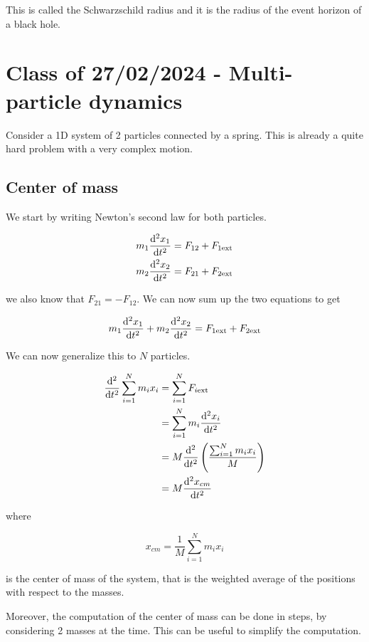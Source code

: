 \documentclass[10pt]{extarticle}
\begin{document}
This is called the Schwarzschild radius and it is the radius of the event horizon of a black hole.

\section{Class of 27/02/2024 - Multi-particle dynamics}

Consider a 1D system of 2 particles connected by a spring.
This is already a quite hard problem with a very complex motion.

\subsection{Center of mass}

We start by writing Newton's second law for both particles.

\begin{align*}
    m_1 \dv[2]{x_1}{t} & = F_{12} + F_{1 \text{ext}} \\
    m_2 \dv[2]{x_2}{t} & = F_{21} + F_{2 \text{ext}}
\end{align*}

we also know that $F_{21} = - F_{12}$. We can now sum up the two equations to get

$$
    m_1 \dv[2]{x_1}{t} + m_2 \dv[2]{x_2}{t} = F_{1 \text{ext}} + F_{2 \text{ext}}
$$

We can now generalize this to $N$ particles.

\begin{align*}
    \dv[2]{t} \sum_{i = 1}^N m_i x_i & = \sum_{i = 1}^N F_{i \text{ext}}                             \\
                                     & = \sum_{i = 1}^N m_i \dv[2]{x_i}{t}                           \\
                                     & = M \dv[2]{t} \left( \frac{\sum_{i = 1}^N m_i x_i}{M} \right) \\
                                     & = M \dv[2]{x_{cm}}{t}
\end{align*}

where

$$
    x_{cm} = \frac{1}{M} \sum_{i = 1}^N m_i x_i
$$

is the center of mass of the system, that is the weighted average of the positions with respect to the masses.

Moreover, the computation of the center of mass can be done in steps, by considering 2 masses at the time. This can be useful to simplify the computation.
\end{document}
